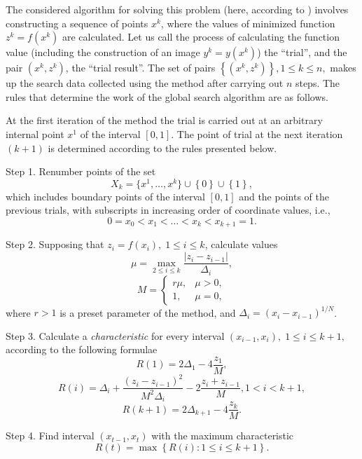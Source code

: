 \documentclass[smallcondensed]{svjour3}     %
\begin{document}
The considered algorithm for solving this problem (here, according to \cite{RefStrongin2000}) involves constructing a sequence of points $x^k$, where the values of minimized function $z^k = f(x^k)$ are calculated. Let us call the process of calculating the function value (including the construction of an image $y^k=y(x^k)$) the ``trial'', and the pair $(x^k, z^k)$, the ``trial result''. The set of pairs $\left\{(x^k, z^k)\right\}, 1\leq k\leq n,$ makes up the search data collected using the method after carrying out $n$ steps. The rules that determine the work of the global search algorithm are as follows.

At the first iteration of the method the trial is carried out at an arbitrary internal point $x^1$ of the interval $[0,1]$. The point of trial at the next iteration $(k+1)$ is determined according to the rules presented below.

Step 1. Renumber points of the set
\[
X_k=\{x^1,\dots,x^k\}\cup\left\{0\right\}\cup\left\{1\right\},
\]
which includes boundary points of the interval $[0,1]$ and the points of the previous trials, with subscripts in increasing order of coordinate values, i.e.,
\[
0=x_0<x_1<\dots <x_k<x_{k+1}=1.
\]

Step 2. Supposing that  $z_i=f(x_i), \; 1\leq i \leq k$, calculate values 
\begin{equation}\label{eq:11}
\mu = \max_{2\leq i \leq k}\frac{\left|z_i-z_{i-1}\right|}{\Delta_i},
\end{equation}
\[
M = \left\{
   \begin{array}{lr}
     r\mu, & \mu > 0,\\
     1, & \mu = 0,
   \end{array}
\right.
 \]
where $r>1$ is a preset parameter of the method, and $\Delta_i=\left(x_i-x_{i-1}\right)^{1/N}$.

Step 3. Calculate a \textit{characteristic} for every interval $(x_{i-1}, x_i), \; 1\leq i \leq k+1,$   according to the following formulae
\[
R(1)=2\Delta_1-4\frac{z_1}{M},
\]
\begin{equation}\label{eq:14}
R(i)=\Delta_i+\frac{(z_i-z_{i-1})^2}{M^2\Delta_i}-2\frac{z_i+z_{i-1}}{M},1<i<k+1,
\end{equation}
\[
R(k+1)=2\Delta_{k+1}-4\frac{z_k}{M}.
\]

Step 4. Find interval $(x_{t-1},x_t)$ with the maximum characteristic
\begin{equation}\label{eq:141}
R(t)=\max{\left\{R(i): 1 \leq i \leq k+1\right\}}.
\end{equation}
\end{document}
